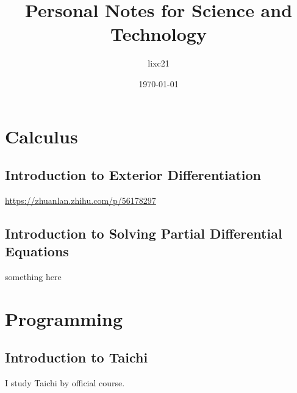 \documentclass[11pt,a4paper]{article}
\title{Personal Notes for Science and Technology}
\author{lixc21}
\date{\today}
\begin{document}
\maketitle
\tableofcontents
\newpage
\color{blue}

\section{Calculus}
\subsection{Introduction to Exterior Differentiation}
\url{https://zhuanlan.zhihu.com/p/56178297}


\subsection{Introduction to Solving Partial Differential Equations}
something here


\section{Programming}
\subsection{Introduction to Taichi}
I study Taichi by official course\cite{TaichiGraphicCourse}.


\newpage


\end{document}
